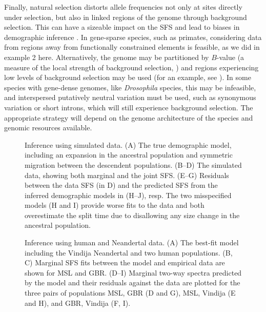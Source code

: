 \documentclass[]{article}
\begin{document}
Finally, natural selection distorts allele frequencies not only at sites
directly under selection, but also in linked regions of the genome through
background selection. This can have a sizeable impact on the SFS and lead to
biases in demographic inference \cite{ewing2016consequences, johri2021impact}.
In gene-sparse species, such as primates, considering data from regions away
from functionally constrained elements is feasible, as we did in example 2
here.  Alternatively, the genome may be partitioned by $B$-value (a measure of
the local strength of background selection, \cite{mcvicker2009widespread}) and
regions experiencing low levels of background selection may be used (for an
example, see \cite{medina2023demographic}). In some species with gene-dense
genomes, like \emph{Drosophila} species, this may be infeasible, and
interspersed putatively neutral variation must be used, such as synonymous
variation or short introns, which will still experience background selection.
The appropriate strategy will depend on the genome architecture of the species
and genomic resources available.





\clearpage

\begin{figure}
    \caption{
        Inference using simulated data. (A) The true demographic model,
        including an expansion in the ancestral population and symmetric
        migration between the descendent populations. (B--D) The simulated
        data, showing both marginal and the joint SFS. (E--G) Residuals
        between the data SFS (in D) and the predicted SFS from the inferred
        demographic models in (H--J), resp.  The two misspecified models (H and
        I) provide worse fits to the data and both overestimate the split time
        due to disallowing any size change in the ancestral population.
    }
    \label{fig:im}
\end{figure}

\begin{figure}
    \caption{
        Inference using human and Neandertal data.
        (A) The best-fit model including the Vindija Neandertal and two human
        populations.
        (B, C) Marginal SFS fits between the model and empirical data are shown
        for MSL and GBR.
        (D--I) Marginal two-way spectra predicted by the model and their residuals 
        against the data are plotted for the three pairs of populations MSL, GBR 
        (D and G), MSL, Vindija (E and H), and GBR, Vindija (F, I).
    }
    \label{fig:humans}
\end{figure}
\end{document}
